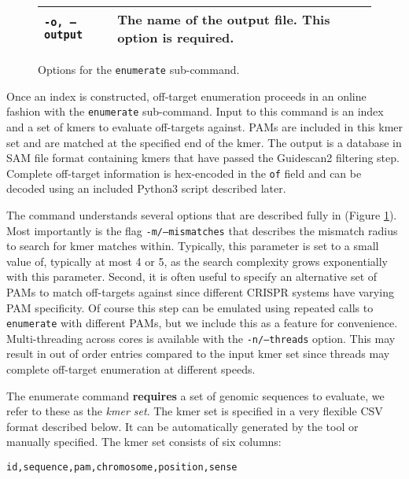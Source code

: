 \documentclass[11pt]{article}
\begin{document}
\begin{figure}[!htb]
\begin{tabular}{|l|l|}
    \texttt{-o, --output}      & The name of the output file. This option is required.                                                                                                                                                                                                                                               \\ \hline
  \end{tabular}
  \caption{\label{fig:enumerate_options} Options for the \texttt{enumerate}
    sub-command.}
\end{figure}


Once an index is constructed, off-target enumeration proceeds in an
online fashion with the \texttt{enumerate} sub-command. Input to this
command is an index and a set of kmers to evaluate off-targets
against. PAMs are included in this kmer set and are matched at the
specified end of the kmer. The output is a database in SAM file format
containing kmers that have passed the Guidescan2 filtering
step. Complete off-target information is hex-encoded in the
\texttt{of} field and can be decoded using an included Python3 script
described later.

The command understands several options that are described fully in
(Figure \ref{fig:enumerate_options}). Most importantly is the flag
\texttt{-m/--mismatches} that describes the mismatch radius to search
for kmer matches within. Typically, this parameter is set to a small
value of, typically at most 4 or 5, as the search complexity grows
exponentially with this parameter. Second, it is often useful to
specify an alternative set of PAMs to match off-targets against since
different CRISPR systems have varying PAM specificity. Of course this
step can be emulated using repeated calls to \texttt{enumerate} with
different PAMs, but we include this as a feature for
convenience. Multi-threading across cores is available with the
\texttt{-n/--threads} option. This may result in out of order entries
compared to the input kmer set since threads may complete off-target
enumeration at different speeds.

The enumerate command {\bf requires} a set of genomic sequences to
evaluate, we refer to these as the {\it kmer set}. The kmer set is
specified in a very flexible CSV format described below. It can be
automatically generated by the tool or manually specified. The kmer
set consists of six columns:

\begin{center}
  \texttt{id,sequence,pam,chromosome,position,sense} 
\end{center}
\end{document}
